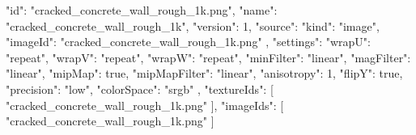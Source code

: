 {
  "id": "cracked_concrete_wall_rough_1k.png",
  "name": "cracked_concrete_wall_rough_1k",
  "version": 1,
  "source": {
    "kind": "image",
    "imageId": "cracked_concrete_wall_rough_1k.png"
  },
  "settings": {
    "wrapU": "repeat",
    "wrapV": "repeat",
    "wrapW": "repeat",
    "minFilter": "linear",
    "magFilter": "linear",
    "mipMap": true,
    "mipMapFilter": "linear",
    "anisotropy": 1,
    "flipY": true,
    "precision": "low",
    "colorSpace": "srgb"
  },
  "textureIds": [
    "cracked_concrete_wall_rough_1k.png"
  ],
  "imageIds": [
    "cracked_concrete_wall_rough_1k.png"
  ]
}
